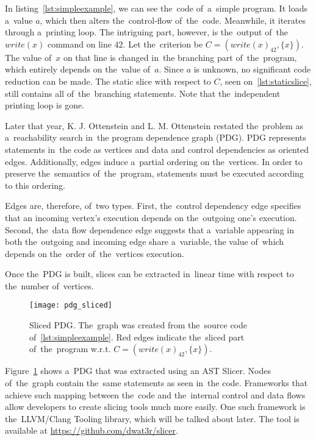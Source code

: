 In listing~\ref{lst:simpleexample}, we can see the~code of~a~simple program.
It loads a~value $a$, which then alters the~control-flow of~the~code.
Meanwhile, it iterates through a~printing loop. 
The intriguing part, however, is the~output of~the~$write(x)$ 
command on line $42$. 
Let the~criterion be $C = (write(x)_{42}, \{x\})$. 
The value of~$x$ on that line is changed in~the branching 
part of~the~program, which entirely depends on the~value of~$a$.
Since $a$ is unknown, no significant code reduction can be made. 
The static slice with respect to $C$, seen on~\ref{lst:staticslice}, 
still contains all of~the~branching statements. 
Note that the~independent printing loop is gone.

Later that year, K. J. Ottenstein and L. M. Ottenstein \citep*{Ottenstein84}
restated the~problem as a~reachability
search in~the program dependence graph (PDG).
PDG represents statements in~the code as vertices and data and control
dependencies as oriented edges. 
Additionally, edges induce a~partial ordering on the~vertices. 
In order to preserve the~semantics of~the~program, statements must be executed 
according to this ordering. 

Edges are, therefore, of~two types. 
First, the~control dependency edge specifies that an incoming vertex's 
execution depends on the~outgoing one's execution. 
Second, the~data flow dependence edge suggests that a~variable appearing
in both the~outgoing and incoming edge share a~variable,
the value of~which depends on the~order of~the~vertices execution.

Once the~PDG is built, slices can be extracted in~linear time 
with respect to the~number of~vertices.

\begin{figure}[ht]\centering
\texttt{[image: pdg\_sliced]}
\caption{Sliced PDG. The~graph was created from the~source 
code of~\ref{lst:simpleexample}.
Red edges indicate the~sliced part of~the~program w.r.t.
$C = (write(x)_{42}, \{x\})$.}
\label{img:pdg}
\end{figure}

Figure~\ref{img:pdg} shows a~PDG that was extracted using an AST Slicer.
Nodes of~the~graph contain the~same statements as seen in~the code.
Frameworks that achieve such mapping between the~code and the~internal
control and data flows allow developers to create slicing tools much 
more easily.
One such framework is the~LLVM/Clang Tooling library, which will be
talked about later.
The tool is available at \url{https://github.com/dwat3r/slicer}.

